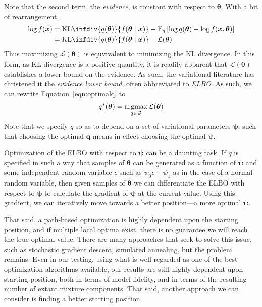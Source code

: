     Note that the second term, the \emph{evidence}, is constant with respect to 
    $\bm{\theta}$.  With a bit of rearrangement,
    \[
        \begin{aligned}
        \log f(\bm{x}) 
            &= \text{KL}\infdiv{q(\bm{\theta})}{f(\bm{\theta}\mid\bm{x})}
                - \text{E}_q\left[
                \log q(\bm{\theta}) - \log f(\bm{x},\bm{\theta})
                \right]\\
            &= \text{KL}\infdiv{q(\bm{\theta})}{f(\bm{\theta}\mid\bm{x})}
                + \mathcal{L}(\bm{\theta})
        \end{aligned}
    \]
    Thus maximizing $\mathcal{L}(\bm{\theta})$ is equvivalent to minimizing the 
    KL divergence. In this form, as KL divergence is a positive quantity, it is
    readily apparent that $\mathcal{L}(\bm{\theta})$ establishes a lower bound
    on the evidence.  As such, the variational literature has christened it the
    \emph{evidence lower bound}, often abbreviated to \emph{ELBO}.  As such,
    we can rewrite Equation~\eqref{eqn:optimalq} to
    \[
        q^*(\bm{\theta}) = \operatorname*{argmax}_{q\in\mathcal{Q}} \mathcal{L}(\bm{\theta})
    \]
    Note that we specify $q$ so as to depend on a set of variational parameters 
    $\bm{\psi}$, such that choosing the optimal $\bm{q}$ means in effect choosing
    the optimal $\bm{\psi}$.  

Optimization of the ELBO with respect to $\bm{\psi}$ can be a daunting task.
    If $q$ is specified in such a way that samples of $\bm{\theta}$ can be 
    generated as a function of $\bm{\psi}$ and some independent random variable 
    $\epsilon$ such as $\psi_0\epsilon + \psi_1$ as in the case of a normal
    random variable, then given samples of $\bm{\theta}$ we can differentiate 
    the ELBO with respect to $\bm{\psi}$ to calculate the gradient of $\bm{\psi}$
    at the current value.  Using this gradient, we can iteratively move towards
    a better position---a more optimal $\bm{\psi}$.

That said, a path-based optimization is highly dependent upon the starting position,
    and if multiple local optima exist, there is no guarantee we will reach the
    true optimal value.  There are many approaches that seek to solve this issue,
    such as stochastic gradient descent, simulated annealing, 
    but the problem remains.  Even in our testing, using what is well regarded as
    one of the best optimization algorithms available, our results are still
    highly dependent upon starting position, both in terms of model fidelity, and
    in terms of the resulting number of extant mixture components.  That said, 
    another approach we can consider is finding a better starting position.

